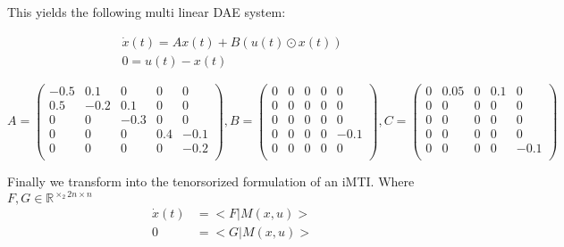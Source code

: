 \documentclass{article}
\begin{document}
{This yields the following multi linear DAE system:

\begin{align}
    \dot{x}(t) = Ax(t) + B(u(t) \odot x(t)) \\
    0 = u(t) - x(t)
\end{align}

\begin{equation}
    A =
    \begin{pmatrix}
        -0.5 & 0.1 & 0 & 0 & 0 \\
        0.5 & -0.2 & 0.1 & 0 & 0 \\
        0 & 0 & -0.3 & 0 & 0 \\
        0 & 0 & 0 & 0.4 & -0.1 \\
        0 & 0 & 0 & 0 & -0.2 \\
    \end{pmatrix},

    B = 
    \begin{pmatrix}
        0 & 0 & 0 & 0 & 0 \\
        0 & 0& 0 & 0 & 0 \\
        0 & 0 & 0 & 0 & 0 \\
        0 & 0 & 0 & 0 & -0.1 \\
        0 & 0 & 0 & 0 & 0 \\
    \end{pmatrix},

    C = 
    \begin{pmatrix}
        0 & 0.05 & 0 & 0.1 & 0 \\
        0 & 0& 0 & 0 & 0 \\
        0 & 0 & 0 & 0 & 0 \\
        0 & 0 & 0 & 0 & 0 \\
        0 & 0 & 0 & 0 & -0.1 \\
    \end{pmatrix}
\end{equation}

Finally we transform into the tenorsorized formulation of an iMTI.
Where $F, G \in \mathbb{R}^{\times_2 2n \times n}$
\begin{align}
    \dot{x}(t) &= <F|M(x,u)> \\
    0 &= <G|M(x,u)>
\end{align}


}
\end{document}
